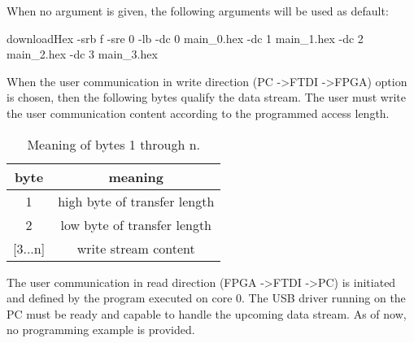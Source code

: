 When no argument is given, the following arguments will be used as default:

downloadHex -srb f -sre 0 -lb -dc 0 main\_0.hex -dc 1 main\_1.hex -dc 2 main\_2.hex -dc 3 main\_3.hex

When the user communication in write direction (PC -\textgreater\space FTDI -\textgreater\space FPGA) option is chosen, then the following bytes qualify the data stream. The user must write the user communication content according to the programmed access length.

\begin{table}[h]
	{
		\begin{small}
			\begin{center}
				\begin{tabular}{c c}
					\hline
					\multicolumn{1}{|c|}{byte} &
					\multicolumn{1}{|c|}{meaning} \\
					\hline
					\multicolumn{1}{|c|}{1} &
					\multicolumn{1}{|c|}{high byte of transfer length} \\
					\hline
					\multicolumn{1}{|c|}{2} &
					\multicolumn{1}{|c|}{low byte of transfer length} \\
					\hline
					\multicolumn{1}{|c|}{[3...n]} &
					\multicolumn{1}{|c|}{write stream content} \\
					\hline
				\end{tabular}
			\end{center}
		\end{small}
	}
	\caption{Meaning of bytes 1 through n.}
	\label{uart_byte_1_5}
\end{table}


The user communication in read direction (FPGA -\textgreater\space FTDI -\textgreater\space PC) is initiated and defined by the program executed on core 0. The USB driver running on the PC must be ready and capable to handle the upcoming data stream. As of now, no programming example is provided.


